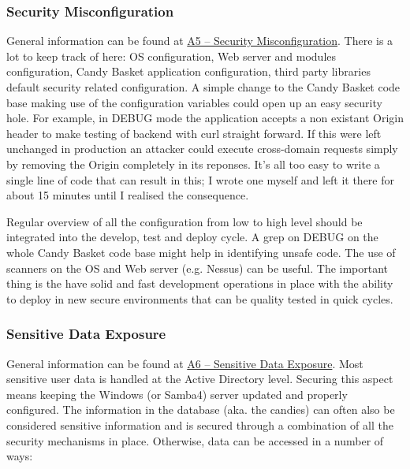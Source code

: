 \documentclass[letterpaper,10pt,english]{sphinxmanual}
\begin{document}
\subsubsection{Security Misconfiguration}
\label{developer-guide:security-misconfiguration}
General information can be found at \href{https://owasp.org/index.php/Top\_10\_2013-A5-Security\_Misconfiguration}{A5 -- Security Misconfiguration}. There
is a lot to keep track of here: OS configuration, Web server and
modules configuration, Candy Basket application configuration, third
party libraries default security related configuration. A simple
change to the Candy Basket code base making use of the configuration
variables could open up an easy security hole. For example, in DEBUG
mode the application accepts a non existant Origin header to make
testing of backend with curl straight forward. If this were left
unchanged in production an attacker could execute cross-domain
requests simply by removing the Origin completely in its
reponses. It's all too easy to write a single line of code that can
result in this; I wrote one myself and left it there for about 15
minutes until I realised the consequence.

Regular overview of all the configuration from low to high level
should be integrated into the develop, test and deploy cycle. A grep
on DEBUG on the whole Candy Basket code base might help in identifying
unsafe code. The use of scanners on the OS and Web server
(e.g. Nessus) can be useful. The important thing is the have solid and
fast development operations in place with the ability to deploy in new
secure environments that can be quality tested in quick cycles.


\subsubsection{Sensitive Data Exposure}
\label{developer-guide:sensitive-data-exposure}
General information can be found at \href{https://owasp.org/index.php/Top\_10\_2013-A6-Sensitive\_Data\_Exposure}{A6 -- Sensitive Data Exposure}. Most
sensitive user data is handled at the Active Directory level. Securing
this aspect means keeping the Windows (or Samba4) server updated and
properly configured. The information in the database (aka. the
candies) can often also be considered sensitive information and is
secured through a combination of all the security mechanisms in
place. Otherwise, data can be accessed in a number of ways:
\end{document}
